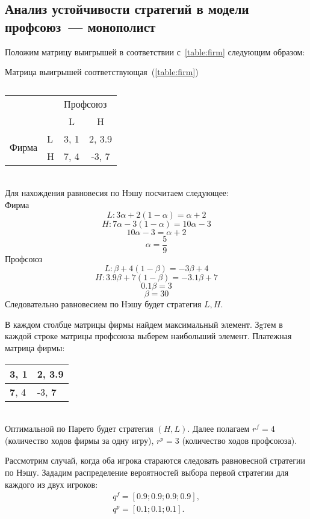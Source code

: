 \subsection{Анализ устойчивости стратегий в модели профсоюз~--- монополист}
Положим матрицу выигрышей в соответствии с~\ref{table:firm} следующим образом:
\begin{table}[h]
	
	\centering
	\caption{}
	\footnotesize Матрица выигрышей соответствующая~(\ref{table:firm})\\
	\normalsize
\begin{tabular}{|l|l|c|c|}
	\hline
	\multicolumn{2}{|l|}{\multirow{2}{*}{}} & \multicolumn{2}{l|}{Профсоюз} \\ \cline{3-4} 
	\multicolumn{2}{|l|}{}                  & L            & H              \\ \hline
	\multirow{2}{*}{Фирма}        & L       & 3, 1         & 2, 3.9         \\ \cline{2-4} 
	& H       & 7, 4         & -3, 7          \\ \hline
\end{tabular}
	\label{table:mono:ex}
\end{table}\\
Для нахождения равновесия по Нэшу посчитаем следующее: \\
Фирма
	$$ L:  3\alpha + 2(1-\alpha)=\alpha + 2$$
	$$ H: 7\alpha - 3(1-\alpha)=10\alpha - 3$$
	$$10\alpha - 3 = \alpha+2 $$
	$$\alpha = \frac{5}{9} $$
Профсоюз	
	 $$L: \beta + 4(1-\beta)=-3\beta + 4$$
	 $$H: 3.9\beta + 7(1-\beta)=-3.1\beta +7$$
	$$0.1\beta  = 3 $$
	$$\beta = 30 $$
Следовательно равновесием по Нэшу будет стратегия $L,H$.

В каждом столбце матрицы фирмы найдем максимальный элемент. 
Зgтем в каждой строке матрицы профсоюза выберем наибольший элемент.
Платежная матрица фирмы:
\begin{table}[h]
	\centering
	\begin{tabular}{|l|l|}
		\hline
		3, 1 & \textbf{2, 3.9}  \\ \hline
		\textbf{7}, 4 & -3, \textbf{7} \\ \hline
	\end{tabular}
\end{table}\\
Оптимальной по Парето будет стратегия $(H,L)$. Далее полагаем $r^f= 4 $ (количество ходов фирмы за одну игру),
$r^p= 3$ (количество ходов профсоюза). 

 Рассмотрим случай, когда оба игрока стараются следовать равновесной стратегии
 по Нэшу.  Зададим распределение вероятностей выбора первой стратегии для
 каждого из двух игроков:
 \begin{gather*}
 	q^f = \left[ 0.9; 0.9; 0.9; 0.9 \right], \\
 	q^p = \left[ 0.1; 0.1; 0.1 \right].
 \end{gather*}

